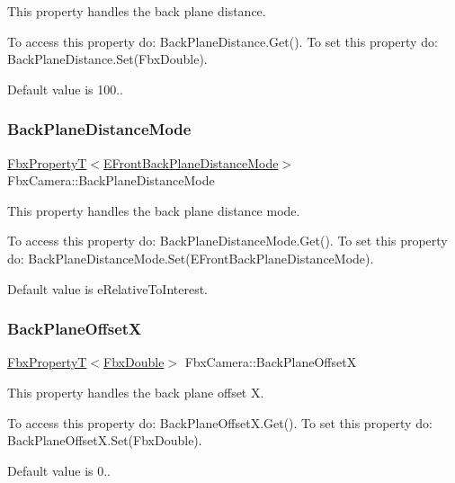 This property handles the back plane distance.

To access this property do\+: Back\+Plane\+Distance.\+Get(). To set this property do\+: Back\+Plane\+Distance.\+Set(\+Fbx\+Double).

Default value is 100.. \mbox{\label{class_fbx_camera_ae12c26a9d3be06c3e118cef04f596224}} 
\subsubsection{\texorpdfstring{Back\+Plane\+Distance\+Mode}{BackPlaneDistanceMode}}
{\footnotesize\ttfamily \hyperlink{class_fbx_property_t}{Fbx\+PropertyT}$<$\hyperlink{class_fbx_camera_a79e74898d117e741c3fbd10b1ef21c79}{E\+Front\+Back\+Plane\+Distance\+Mode}$>$ Fbx\+Camera\+::\+Back\+Plane\+Distance\+Mode}

This property handles the back plane distance mode.

To access this property do\+: Back\+Plane\+Distance\+Mode.\+Get(). To set this property do\+: Back\+Plane\+Distance\+Mode.\+Set(\+E\+Front\+Back\+Plane\+Distance\+Mode).

Default value is e\+Relative\+To\+Interest. \mbox{\label{class_fbx_camera_a2a71f39683269b49b67e007c7d19d67b}} 
\subsubsection{\texorpdfstring{Back\+Plane\+OffsetX}{BackPlaneOffsetX}}
{\footnotesize\ttfamily \hyperlink{class_fbx_property_t}{Fbx\+PropertyT}$<$\hyperlink{fbxtypes_8h_a171e72a1c46fc15c1a6c9c31948c1c5b}{Fbx\+Double}$>$ Fbx\+Camera\+::\+Back\+Plane\+OffsetX}

This property handles the back plane offset X.

To access this property do\+: Back\+Plane\+Offset\+X.\+Get(). To set this property do\+: Back\+Plane\+Offset\+X.\+Set(\+Fbx\+Double).

Default value is 0.. \mbox{\label{class_fbx_camera_abfbc1d3377ed9721492971011fd8f5ed}} 
